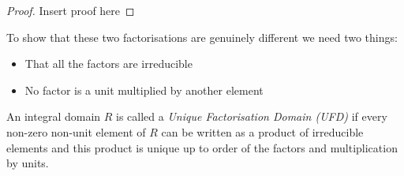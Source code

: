 \begin{proof}
  Insert proof here
\end{proof}

\begin{method}
  To show that these two factorisations are genuinely different we need two things:
\begin{itemize}
\item[-] That all the factors are irreducible
\item[-] No factor is a unit multiplied by another element

\end{itemize}
\end{method}

\begin{definition}
  An integral domain \(R\) is called a \emph{Unique Factorisation Domain (UFD)} if every non-zero non-unit element of \(R\) can be written as a product of irreducible elements and this product is unique up to order of the factors and multiplication by units.
\end{definition}




